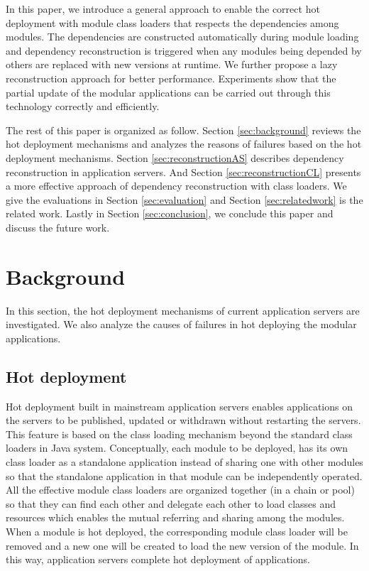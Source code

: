 \documentclass[conference]{IEEEtran}
\begin{document}
In this paper, we introduce a general approach to enable the correct hot deployment  with module class loaders that respects the dependencies among modules. The dependencies are constructed automatically during module loading and dependency reconstruction is triggered when any modules being depended by others are replaced with new versions at runtime. We further propose a lazy reconstruction approach for better performance. Experiments show that the partial update of the modular applications can be carried out through this technology correctly and efficiently.

The rest of this paper is organized as follow. 
Section \ref{sec:background} reviews the hot deployment mechanisms and analyzes the reasons of failures based on the hot deployment mechanisms. Section \ref{sec:reconstructionAS} describes dependency reconstruction in application servers. And Section \ref{sec:reconstructionCL} presents a more effective approach of dependency reconstruction with class loaders.
We give the evaluations in Section \ref{sec:evaluation} and Section \ref{sec:relatedwork} is the related work. Lastly in Section \ref{sec:conclusion}, we conclude this paper and discuss the future work.



\section{Background\label{sec:background}}
In this section, the hot deployment mechanisms of current application servers are investigated. We also analyze the causes of failures in hot deploying the modular applications.

\subsection{Hot deployment}

Hot deployment built in mainstream application servers enables applications on the servers to be published, updated or withdrawn without restarting the servers. This feature is based on the class loading mechanism beyond the standard class loaders\cite{standard_cl} in Java system. Conceptually, each module to be deployed, has its own class loader as a standalone application instead of sharing one with other modules so that the standalone application in that module can be independently operated. All the effective module class loaders are organized together (in a chain or pool) so that they can find each other and delegate each other to load classes and resources which enables the mutual referring and sharing among the modules. When a module is hot deployed, the corresponding module class loader will be removed and a new one will be created to load the new version of the module. In this way, application servers complete hot deployment of applications\cite{module_cl}.
\end{document}
